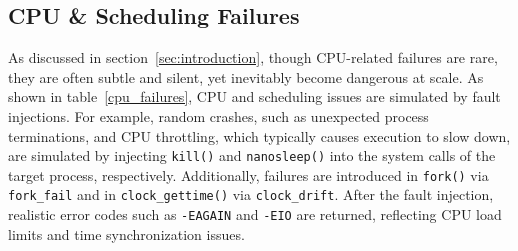 \subsection{CPU \& Scheduling Failures}

As discussed in section~\ref{sec:introduction}, though CPU-related failures are rare, they are often subtle and silent, yet inevitably become dangerous at scale. As shown in table~\ref{cpu_failures}, CPU and scheduling issues are simulated
by fault injections. For example, random crashes, such as unexpected process terminations, and CPU throttling, which typically causes execution to slow down, are simulated by injecting \texttt{kill()} and \texttt{nanosleep()} into the system calls of the target process, respectively.
Additionally, failures are introduced in \texttt{fork()} via \texttt{fork\_fail} and in \texttt{clock\_gettime()} via \texttt{clock\_drift}.
 After the fault injection, realistic error codes such as \texttt{-EAGAIN} and \texttt{-EIO} are returned, reflecting CPU load limits and time synchronization issues.


\begin{table}[ht]
\centering
\caption{CPU Failures (Compute \& Scheduling)}
\label{cpu_failures}
\end{table}

